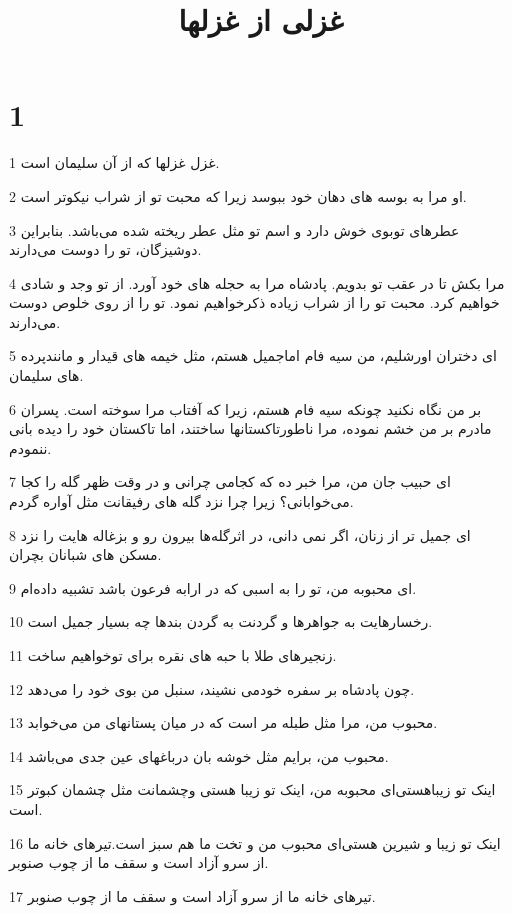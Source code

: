 

\title{غزلی از غزلها}

 
\chapter{1}

\par 1 غزل غزلها که از آن سلیمان است.
\par 2 او مرا به بوسه های دهان خود ببوسد زیرا که محبت تو از شراب نیکوتر است.
\par 3 عطرهای توبوی خوش دارد و اسم تو مثل عطر ریخته شده می‌باشد. بنابراین دوشیزگان، تو را دوست می‌دارند.
\par 4 مرا بکش تا در عقب تو بدویم. پادشاه مرا به حجله های خود آورد. از تو وجد و شادی خواهیم کرد. محبت تو را از شراب زیاده ذکرخواهیم نمود. تو را از روی خلوص دوست می‌دارند.
\par 5 ‌ای دختران اورشلیم، من سیه فام اماجمیل هستم، مثل خیمه های قیدار و مانندپرده های سلیمان.
\par 6 بر من نگاه نکنید چونکه سیه فام هستم، زیرا که آفتاب مرا سوخته است. پسران مادرم بر من خشم نموده، مرا ناطورتاکستانها ساختند، اما تاکستان خود را دیده بانی ننمودم.
\par 7 ‌ای حبیب جان من، مرا خبر ده که کجامی چرانی و در وقت ظهر گله را کجا می‌خوابانی؟ زیرا چرا نزد گله های رفیقانت مثل آواره گردم.
\par 8 ‌ای جمیل تر از زنان، اگر نمی دانی، در اثرگله‌ها بیرون رو و بزغاله هایت را نزد مسکن های شبانان بچران.
\par 9 ‌ای محبوبه من، تو را به اسبی که در ارابه فرعون باشد تشبیه داده‌ام.
\par 10 رخسارهایت به جواهرها و گردنت به گردن بندها چه بسیار جمیل است.
\par 11 زنجیرهای طلا با حبه های نقره برای توخواهیم ساخت.
\par 12 چون پادشاه بر سفره خودمی نشیند، سنبل من بوی خود را می‌دهد.
\par 13 محبوب من، مرا مثل طبله مر است که در میان پستانهای من می‌خوابد.
\par 14 محبوب من، برایم مثل خوشه بان درباغهای عین جدی می‌باشد.
\par 15 اینک تو زیباهستی‌ای محبوبه من، اینک تو زیبا هستی وچشمانت مثل چشمان کبوتر است.
\par 16 اینک تو زیبا و شیرین هستی‌ای محبوب من و تخت ما هم سبز است.تیرهای خانه ما از سرو آزاد است و سقف ما از چوب صنوبر.
\par 17 تیرهای خانه ما از سرو آزاد است و سقف ما از چوب صنوبر.
 
